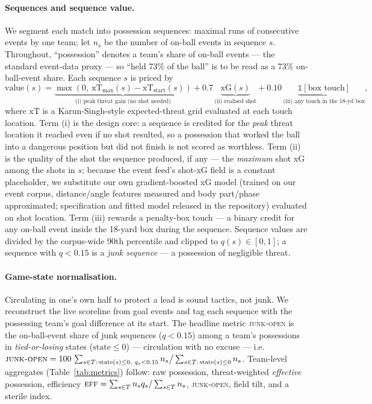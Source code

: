 \documentclass[11pt]{article}
\newcommand{\junk}{\textsc{junk-open}}
\newcommand{\eff}{\textsc{eff}}
\begin{document}
\paragraph{Sequences and sequence value.} We segment each match into possession
sequences: maximal runs of consecutive events by one team; let $n_s$ be the
number of on-ball events in sequence $s$. Throughout, ``possession'' denotes a
team's share of on-ball events --- the standard event-data proxy --- so
``held 73\% of the ball'' is to be read as a 73\% on-ball-event share. Each
sequence $s$ is priced by
\begin{equation}
\mathrm{value}(s) = \underbrace{\max(0,\ \mathrm{xT}_{\max}(s) - \mathrm{xT}_{\mathrm{start}}(s))}_{\text{(i) peak threat gain (no shot needed)}}
+ 0.7\,\underbrace{\mathrm{xG}(s)}_{\text{(ii) realised shot}}
+ 0.10\,\underbrace{\mathbb{1}[\text{box touch}]}_{\text{(iii) any touch in the 18-yd box}},
\label{eq:value}
\end{equation}
where $\mathrm{xT}$ is a Karun-Singh-style expected-threat grid evaluated at
each touch location. Term (i) is the design core: a sequence is credited for
the \emph{peak} threat location it reached even if no shot resulted, so a
possession that worked the ball into a dangerous position but did not finish is
not scored as worthless. Term (ii) is the quality of the shot the sequence
produced, if any --- the \emph{maximum} shot xG among the shots in $s$; because
the event feed's shot-xG field is a constant placeholder, we substitute our own
gradient-boosted xG model (trained on our event corpus, distance/angle features
measured and body part/phase approximated; specification and fitted model
released in the repository) evaluated on shot location. Term (iii) rewards a
penalty-box touch --- a binary credit for any on-ball event inside the 18-yard
box during the sequence. Sequence values are divided
by the corpus-wide 90th percentile and clipped to $q(s) \in [0,1]$; a sequence
with $q < 0.15$ is a \emph{junk sequence} --- a possession of negligible threat.

\paragraph{Game-state normalisation.} Circulating in one's own half to protect
a lead is sound tactics, not junk. We reconstruct the live scoreline from goal
events and tag each sequence with the possessing team's goal difference at its
start. The headline metric \junk{} is the on-ball-event share of junk sequences
($q<0.15$) among a team's possessions in \emph{tied-or-losing} states
($\text{state} \le 0$) --- circulation with no excuse --- i.e.\
$\junk = 100\,\sum_{s\in T:\,\mathrm{state}(s)\le 0,\ q_s<0.15} n_s \big/
\sum_{s\in T:\,\mathrm{state}(s)\le 0} n_s$. Team-level aggregates
(Table~\ref{tab:metrics}) follow: raw possession, threat-weighted
\emph{effective} possession, efficiency
$\eff = \sum_{s\in T} n_s q_s / \sum_{s\in T} n_s$, \junk{}, field tilt, and a
sterile index.
\end{document}
